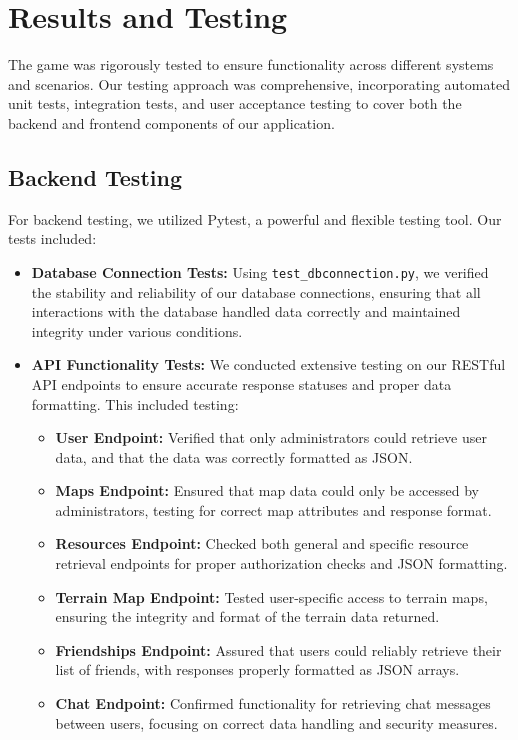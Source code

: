 \documentclass[12pt]{article}
\begin{document}
\section{Results and Testing}
The game was rigorously tested to ensure functionality across different systems and scenarios. Our testing approach was comprehensive, incorporating automated unit tests, integration tests, and user acceptance testing to cover both the backend and frontend components of our application.
\subsection{Backend Testing}
For backend testing, we utilized Pytest, a powerful and flexible testing tool. Our tests included:
\begin{itemize}
    \item \textbf{Database Connection Tests:} Using \texttt{test\_dbconnection.py}, we verified the stability and reliability of our database connections, ensuring that all interactions with the database handled data correctly and maintained integrity under various conditions.
    \item \textbf{API Functionality Tests:} We conducted extensive testing on our RESTful API endpoints to ensure accurate response statuses and proper data formatting. This included testing:
        \begin{itemize}
            \item \textbf{User Endpoint:} Verified that only administrators could retrieve user data, and that the data was correctly formatted as JSON.
            \item \textbf{Maps Endpoint:} Ensured that map data could only be accessed by administrators, testing for correct map attributes and response format.
            \item \textbf{Resources Endpoint:} Checked both general and specific resource retrieval endpoints for proper authorization checks and JSON formatting.
            \item \textbf{Terrain Map Endpoint:} Tested user-specific access to terrain maps, ensuring the integrity and format of the terrain data returned.
            \item \textbf{Friendships Endpoint:} Assured that users could reliably retrieve their list of friends, with responses properly formatted as JSON arrays.
            \item \textbf{Chat Endpoint:} Confirmed functionality for retrieving chat messages between users, focusing on correct data handling and security measures.

\end{itemize}
\end{itemize}
\end{document}
